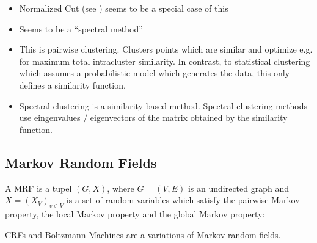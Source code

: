 \begin{itemize}
    \item Normalized Cut (see \cite{shi2000normalized}) seems to be a special
          case of this
    \item Seems to be a \enquote{spectral method}
    \item This is pairwise clustering. Clusters points which are similar and
          optimize e.g. for maximum total intracluster similarity. In contrast,
          to statistical clustering which assumes a probabilistic model which
          generates the data, this only defines a similarity function.
    \item Spectral clustering is a similarity based method. Spectral clustering
          methods use eingenvalues / eigenvectors of the matrix obtained by the
          similarity function.
\end{itemize}


\subsection{Markov Random Fields}\label{subsec:markov-random-fields}
A \Gls{MRF} is a tupel $(G, X)$, where $G=(V,E)$ is an undirected graph and
$X=(X_V)_{v \in V}$ is a set of random variables which satisfy the pairwise
Markov property, the local Markov property and the global Markov property:



\Glspl{CRF} and Boltzmann Machines are a variations of Markov random fields.

%

